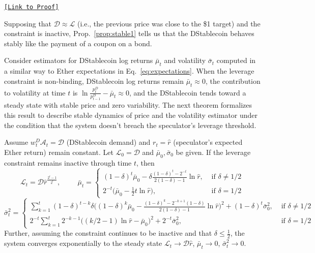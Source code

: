 \begin{center} \hyperlink{pf:stable1}{\texttt{[Link to Proof]}} \end{center}


Supposing that $\mathcal{D}\approx \mathcal{L}$ (i.e., the previous price was close to the \$1 target) and the constraint is inactive, Prop.~\ref{prop:stable1} tells us that the DStablecoin behaves stably like the payment of a coupon on a bond.

Consider estimators for DStablecoin log returns $\bar \mu_t$ and volatility $\bar \sigma_t$ computed in a similar way to Ether expectations in Eq.~\ref{eq:expectations}. When the leverage constraint is non-binding, DStablecoin log returns remain $\bar \mu_t \approx 0$, the contribution to volatility at time $t$ is $\ln \frac{p_t^D}{p_{t-1}^D} - \bar \mu_t \approx 0$, and the DStablecoin tends toward a steady state with stable price and zero variability. The next theorem formalizes this result to describe stable dynamics of price and the volatility estimator under the condition that the system doesn't breach the speculator's leverage threshold.

\begin{theorem}\label{prop:stable2}
	Assume $w_t^D \mathcal{A}_t = \mathcal{D}$ (DStablecoin demand) and $r_t = \hat r$ (speculator's expected Ether return) remain constant. Let $\mathcal{L}_0=\mathcal{D}$ and $\bar \mu_0, \bar \sigma_0$ be given. If the leverage constraint remains inactive through time $t$, then
	$$\mathcal{L}_t = \mathcal{D}\hat{r}^{\frac{2^t-1}{2^t}},
	\hspace{1cm} \bar \mu_t = \begin{cases}
	(1-\delta)^t \bar \mu_0 - \delta \frac{(1-\delta)^t-2^{-t}}{2(1-\delta)-1} \ln \hat r, & \text{ if } \delta \neq 1/2 \\
	2^{-t}\Big( \bar \mu_0 - \frac{1}{2} t \ln \hat r \Big), & \text{ if } \delta = 1/2
	\end{cases}$$
	$$\bar\sigma_t^2 = \begin{cases}
	\sum_{k=1}^t (1-\delta)^{t-k}\delta \Big( (1-\delta)^k \bar \mu_0 - \frac{(1-\delta)^k -2^{-k+1}(1-\delta)}{2(1-\delta)-1}\ln \hat r \Big)^2 + (1-\delta)^t\bar\sigma_0^2, & \text{ if } \delta \neq 1/2 \\
	2^{-t} \sum_{k=1}^t 2^{-k-1} \Big( (k/2-1)\ln \hat r - \bar \mu_0\Big)^2 + 2^{-t} \bar\sigma_0^2, & \text{ if } \delta=1/2
	\end{cases}$$
	Further, assuming the constraint continues to be inactive and that $\delta \leq \frac{1}{2}$, the system converges exponentially to the steady state
	$\mathcal{L}_t \rightarrow \mathcal{D}\hat r$,
	$\bar \mu_t \rightarrow 0$,
	$\bar\sigma_t^2 \rightarrow 0$.
\end{theorem}

